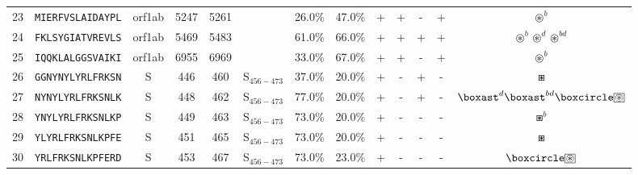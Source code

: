 \begin{tabular}{rcccccccccccc}
23 &  \texttt{MIERFVSLAIDAYPL} &  orf1ab &   5247 &  5261 &                &                          26.0\% &                           47.0\% &          + &           + &          - &           + &                                                                                                       $ \circledast^b $ \\
24 &  \texttt{FKLSYGIATVREVLS} &  orf1ab &   5469 &  5483 &                &                          61.0\% &                           66.0\% &          + &           + &          + &           + &                                                                        $ \circledast^b \circledast^d \circledast^{bd} $ \\
25 &  \texttt{IQQKLALGGSVAIKI} &  orf1ab &   6955 &  6969 &                &                          33.0\% &                           67.0\% &          + &           + &          - &           + &                                                                                                       $ \circledast^b $ \\
26 &  \texttt{GGNYNYLYRLFRKSN} &       S &    446 &   460 &  S$_{456-473}$ &                          37.0\% &                           20.0\% &          + &           - &          + &           - &                                                                                                             $ \boxast $ \\
27 &  \texttt{NYNYLYRLFRKSNLK} &       S &    448 &   462 &  S$_{456-473}$ &                          77.0\% &                           20.0\% &          + &           - &          + &           - &                                   $ \boxast^d \boxast^{bd} \boxcircle \setlength{\fboxsep}{0.5pt} \boxed{\circledast} $ \\
28 &  \texttt{YNYLYRLFRKSNLKP} &       S &    449 &   463 &  S$_{456-473}$ &                          73.0\% &                           20.0\% &          + &           - &          - &           - &                                                                                                           $ \boxast^b $ \\
29 &  \texttt{YLYRLFRKSNLKPFE} &       S &    451 &   465 &  S$_{456-473}$ &                          73.0\% &                           20.0\% &          + &           - &          - &           - &                                                                                                             $ \boxast $ \\
30 &  \texttt{YRLFRKSNLKPFERD} &       S &    453 &   467 &  S$_{456-473}$ &                          73.0\% &                           23.0\% &          + &           - &          - &           - &                                                          $ \boxcircle \setlength{\fboxsep}{0.5pt} \boxed{\circledast} $ \\

\end{tabular}
